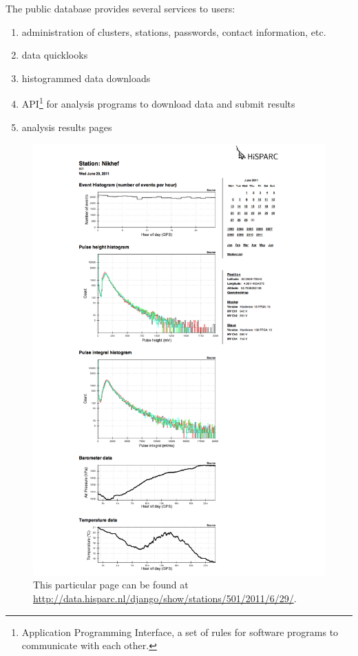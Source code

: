 The public database provides several services to users:
\begin{enumerate}
    \item administration of clusters, stations, passwords, contact information,
    etc.
    \item data quicklooks
    \item histogrammed data downloads
    \item API\footnote{Application Programming Interface, a set of rules for
    software programs to communicate with each other.} for analysis programs to
    download data and submit results
    \item analysis results pages
\end{enumerate}

\begin{figure}
\centering
\includegraphics[height=.9\textheight]{figures/quicklooks-screenshot}
\caption{  This particular page can be found at
\url{http://data.hisparc.nl/django/show/stations/501/2011/6/29/}.}
\label{fig:quicklooks-screenshot}
\end{figure}

